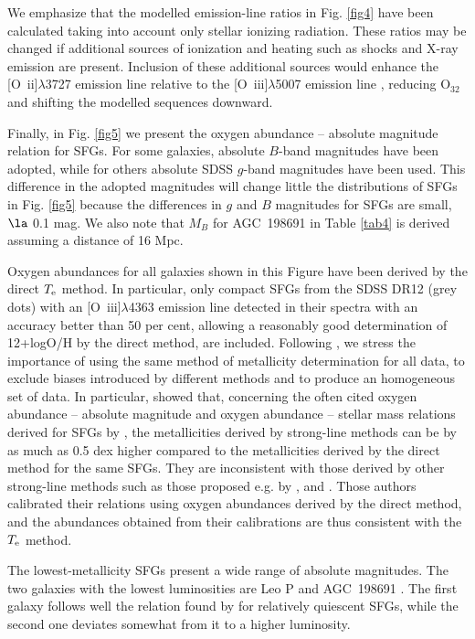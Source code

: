 \documentclass[useAMS,usenatbib]{mn2e}
\begin{document}
We emphasize that the modelled emission-line
ratios in Fig. \ref{fig4} have been calculated taking into account only stellar
ionizing radiation. These ratios may be changed if additional sources of 
ionization and heating such as shocks and X-ray emission are present.
Inclusion of these additional sources would enhance 
the [O~{\sc ii}]$\lambda$3727 emission line relative  
to the [O~{\sc iii}]$\lambda$5007 emission line \citep[e.g. ][]{S15}, reducing 
O$_{32}$ and shifting the modelled sequences downward.

Finally, in Fig. \ref{fig5} we present the oxygen abundance -- absolute 
magnitude relation for SFGs. 
For some galaxies, absolute 
$B$-band magnitudes have been adopted, while for others absolute SDSS $g$-band
magnitudes have been used. This difference in the adopted magnitudes 
will change little the distributions of SFGs in 
Fig. \ref{fig5} because the differences in $g$ and $B$ magnitudes 
for SFGs are small, $\la$ 0.1 mag. We also note that $M_B$ for AGC~198691 
in Table \ref{tab4} is derived assuming a distance of 16 Mpc.

Oxygen abundances for
all galaxies shown in this Figure have been derived by the direct $T_{\rm e}$ 
method.
In particular, only compact SFGs from the SDSS DR12 (grey dots) 
with an [O~{\sc iii}]$\lambda$4363 emission line detected in their spectra
with an accuracy better than 50 per cent, allowing a reasonably good determination
of 12+logO/H by the direct method, are included. Following \citet{I15}, we stress the 
importance of using the same method of metallicity determination for all 
data, to exclude biases introduced by different methods and to produce an 
homogeneous set of data. In particular,
\citet{I15} showed that, concerning the often cited oxygen abundance -- absolute 
magnitude and oxygen abundance -- stellar mass relations derived for SFGs by 
\citet{T04}, the metallicities
derived by strong-line methods can be by as much as 0.5 dex 
higher compared to the metallicities derived by the direct method for the
same SFGs. They are inconsistent with those derived by other strong-line 
methods 
such as those proposed e.g. by \citet{PP04}, \citet{PT05} and \citet{I15}. 
Those authors  
calibrated their relations using oxygen abundances derived by the direct 
method, and the abundances obtained from their calibrations are thus 
consistent with the $T_{\rm e}$ method.

The lowest-metallicity SFGs present a wide range of absolute magnitudes. The 
two galaxies with the lowest luminosities are Leo P
\citep{S13} and AGC~198691 \citep{H16}. The first galaxy follows well  
the relation found by \citet{B12} for relatively quiescent 
SFGs, while the second one deviates somewhat from it to a higher luminosity.
\end{document}
